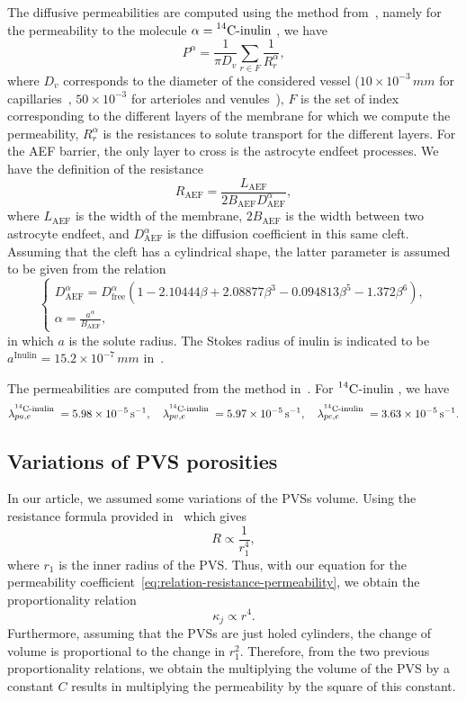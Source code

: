 \documentclass[10pt]{article}
\newcommand{\AP}[1]{\textcolor{blue}{AP: #1}}
\newcommand{\1}{^{(1)}}
\newcommand{\2}{^{(2)}}
\newcommand{\Cinulin}{$\prescript{14}{}{\text{C}}$-inulin }
\begin{document}
The diffusive permeabilities are computed using the method from~\cite{li-2010-BBB}, namely for the permeability to the molecule $\alpha = \text{\Cinulin}$, we have
\[
    P^\alpha = \frac{1}{\pi D_v} \sum_{r \in F} \frac{1}{R_r^\alpha}, 
\]
where $D_v$ corresponds to  the diameter of the considered vessel ($10\times 10^{-3}\, \si{mm}$ for capillaries~\cite{farkas-diam-capillaries}, $50\times 10^{-3}$ for arterioles and venules~\cite{Al-arterial-diam,Nguyen-venule-diam}), $F$ is the set of index corresponding to the different layers of the membrane for which we compute the permeability, $R_r^\alpha$ is the resistances to solute transport for the different layers. 
For the AEF barrier, the only layer to cross is the astrocyte endfeet processes. We have the definition of the resistance 
\[
    R_\text{AEF}= \frac{L_\text{AEF}}{2 B_\text{AEF} D^\alpha_\text{AEF}},
\]
where $L_\text{AEF}$ is the width of the membrane, $2 B_\text{AEF}$ is the width between two astrocyte endfeet, and $ D^\alpha_\text{AEF}$ is the diffusion coefficient in this same cleft. 
Assuming that the cleft has a cylindrical shape, the latter parameter is assumed to be given from the relation~\cite{Michel-1999-permeablity} 
\[
\begin{cases}
D^\alpha_\text{AEF} = D^\alpha_\text{free}\left(1-2.10444\beta +2.08877\beta^3 - 0.094813\beta^5 - 1.372\beta^6 \right),\\
\alpha = \frac{a^\alpha}{B_\text{AEF}},
\end{cases}
\]
in which $a$ is the solute radius. The Stokes radius of inulin is indicated to be $a^\text{Inulin} = 15.2\times 10^{-7} \, \si{mm}$ in~\cite{Schultz-hydro-radii-1961}.

The permeabilities are computed from the method in~\cite{li-2010-BBB}. For \Cinulin, we have 
\[
        \lambda_{pa,e}^\text{\Cinulin} = 5.98\times 10^{-5}\,\si{\second^{-1}}, \quad \lambda_{pv,e}^\text{\Cinulin} = 5.97 \times 10^{-5}\,\si{\second^{-1}}, \quad \lambda_{pc,e}^\text{\Cinulin} = 3.63 \times 10^{-5}\, \si{\second^{-1}}.  
\]

\subsection{Variations of PVS porosities}

In our article, we assumed some variations of the PVSs volume. Using the resistance formula provided in~\cite{Vinje-2020-ICP} which gives 
\[
R \propto \frac{1}{r_1^4},
\]
where $r_1$ is the inner radius of the PVS.  
Thus, with our equation for the permeability coefficient~\eqref{eq:relation-resistance-permeability}, we obtain the proportionality relation 
\[
\kappa_j \propto r^4.
\]
Furthermore, assuming that the PVSs are just holed cylinders, the change of volume is proportional to the change in $r_1^2$. 
Therefore, from the two previous proportionality relations, we obtain the multiplying the volume of the PVS by a constant $C$ results in multiplying the permeability by the square of this constant.  
\end{document}
